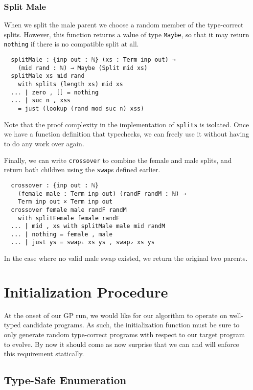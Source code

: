 \documentclass[runningheads,a4paper]{llncs}
\begin{document}
\subsubsection{Split Male}

When we split the male parent we choose a random member of the
type-correct splits. However, this function returns a value of type
\texttt{Maybe}, so that it may return \texttt{nothing} if there is no
compatible split at all.

\begin{verbatim}
  splitMale : {inp out : ℕ} (xs : Term inp out) →
    (mid rand : ℕ) → Maybe (Split mid xs)
  splitMale xs mid rand
    with splits (length xs) mid xs
  ... | zero , [] = nothing
  ... | suc n , xss
    = just (lookup (rand mod suc n) xss)
\end{verbatim}

Note that the proof complexity in the implementation of
\texttt{splits} is isolated. Once we have a function definition that
typechecks, we can freely use it without having to do any work over
again.

Finally, we can write \texttt{crossover} to combine the female and
male splits, and return both children using the \texttt{swap}s defined
earlier.

\begin{verbatim}
  crossover : {inp out : ℕ}
    (female male : Term inp out) (randF randM : ℕ) →
    Term inp out × Term inp out
  crossover female male randF randM
    with splitFemale female randF
  ... | mid , xs with splitMale male mid randM
  ... | nothing = female , male
  ... | just ys = swap₁ xs ys , swap₂ xs ys
\end{verbatim}

In the case where no valid male swap existed, we return the original
two parents.

\section{Initialization Procedure}

At the onset of our GP run, we would like for our algorithm to operate
on well-typed candidate programs. As such, the initialization function
must be sure to only generate random type-correct programs with
respect to our target program to evolve. By now it should come as now
surprise that we can and will enforce this requirement statically.

\subsection{Type-Safe Enumeration}
\end{document}
